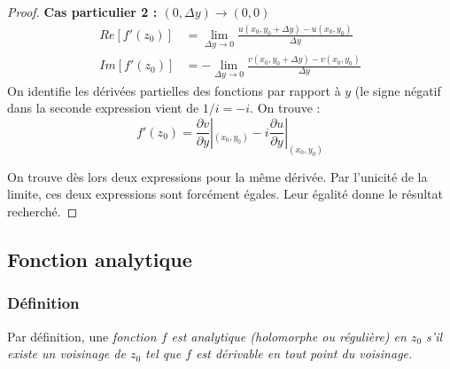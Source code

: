 \begin{proof}
	\textbf{Cas particulier 2 : $(0,\Delta y) \rightarrow (0,0)$}\\
	\begin{equation}
		\begin{array}{ll}
			Re[f'(z_0)] & = \lim\limits_{\Delta y\rightarrow 0} \frac{u(x_0, y_0+\Delta y) - u(x_0, y_0)}{\Delta y}  \\
			Im[f'(z_0)] & = -\lim\limits_{\Delta y\rightarrow 0} \frac{v(x_0, y_0+\Delta y) - v(x_0, y_0)}{\Delta y} 
		\end{array}
	\end{equation}
	On identifie les dérivées partielles des fonctions par rapport à $y$ (le signe négatif dans la seconde
	expression vient de $1/i = -i$. On trouve :
	\begin{equation}
		f'(z_0) = \frac{\partial v}{\partial y}|_{(x_0,y_0)} - i\frac{\partial u}{\partial y}|_{(x_0,y_0)}
	\end{equation}
	    
	On trouve dès lors deux expressions pour la même dérivée. Par l'unicité de la limite, ces deux expressions
	sont forcément égales. Leur égalité donne le résultat recherché.
\end{proof}
    
    
    
\subsection{Fonction analytique}
\subsubsection{Définition}
Par définition, une \textit{fonction $f$ est analytique (holomorphe ou régulière) en $z_0$ s'il existe un
	voisinage de $z_0$ tel que $f$ est dérivable en tout point du voisinage.}\\
\ \\
    
